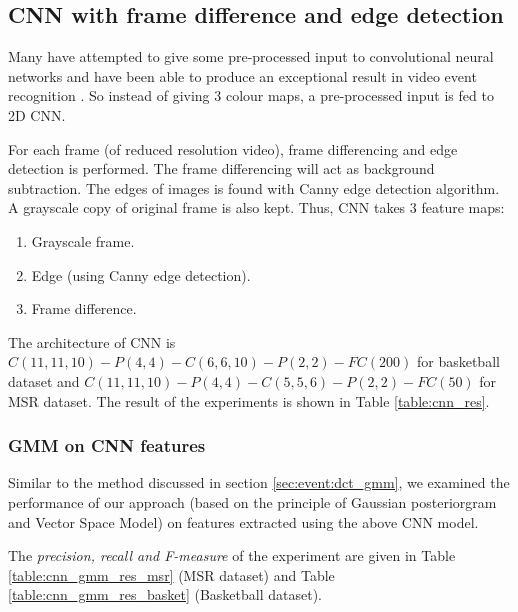 \subsection{CNN with frame difference and edge detection}

Many have attempted to give some pre-processed input to convolutional neural networks and have been able to produce an exceptional result in video event recognition \citep{ji20133d}.  So instead of giving 3 colour maps, a pre-processed input is fed to 2D CNN.

For each frame (of reduced resolution video), frame differencing and edge detection is performed.  The frame differencing will act as background subtraction.  The edges of images is found with Canny edge detection algorithm.  A grayscale copy of original frame is also kept.  Thus, CNN takes 3 feature maps:
\begin{enumerate}
\item Grayscale frame.
\item Edge (using Canny edge detection).
\item Frame difference.
\end{enumerate}

The architecture of CNN is $C(11, 11, 10)-P(4, 4)-C(6, 6, 10)-P(2, 2)-FC(200)$ for basketball dataset and $C(11, 11, 10)-P(4,4)-C(5, 5, 6)-P(2,2)-FC(50)$ for MSR dataset.  The result of the experiments is shown in Table \ref{table:cnn_res}.


\subsubsection{GMM on CNN features}
Similar to the method discussed in section \ref{sec:event:dct_gmm}, we examined the performance of our approach (based on the principle of Gaussian posteriorgram and Vector Space Model) on features extracted using the above CNN model.

The \textit{precision, recall and F-measure} of the experiment are given in Table \ref{table:cnn_gmm_res_msr} (MSR dataset) and Table \ref{table:cnn_gmm_res_basket} (Basketball dataset).

